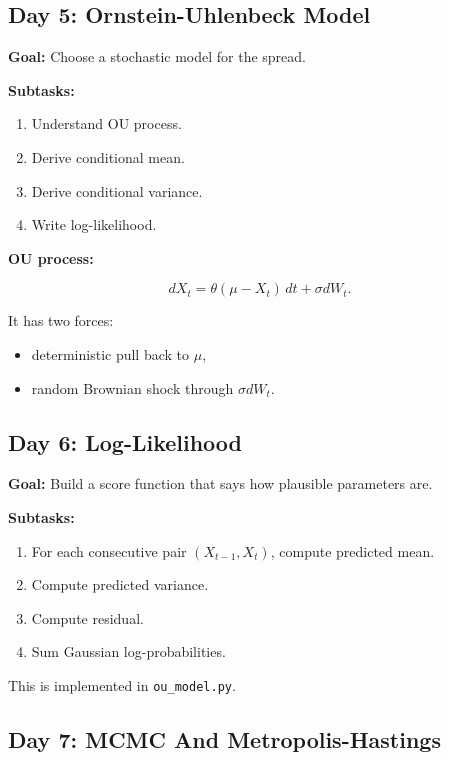 \documentclass[11pt]{article}
\newcommand{\code}[1]{\texttt{#1}}
\begin{document}
\subsection{Day 5: Ornstein-Uhlenbeck Model}

\textbf{Goal:} Choose a stochastic model for the spread.

\textbf{Subtasks:}

\begin{enumerate}
  \item Understand OU process.
  \item Derive conditional mean.
  \item Derive conditional variance.
  \item Write log-likelihood.
\end{enumerate}

\textbf{OU process:}

\[
dX_t = \theta(\mu - X_t)\,dt + \sigma dW_t.
\]

It has two forces:

\begin{itemize}
  \item deterministic pull back to $\mu$,
  \item random Brownian shock through $\sigma dW_t$.
\end{itemize}

\subsection{Day 6: Log-Likelihood}

\textbf{Goal:} Build a score function that says how plausible parameters are.

\textbf{Subtasks:}

\begin{enumerate}
  \item For each consecutive pair $(X_{t-1}, X_t)$, compute predicted mean.
  \item Compute predicted variance.
  \item Compute residual.
  \item Sum Gaussian log-probabilities.
\end{enumerate}

This is implemented in \code{ou\_model.py}.

\subsection{Day 7: MCMC And Metropolis-Hastings}
\end{document}
